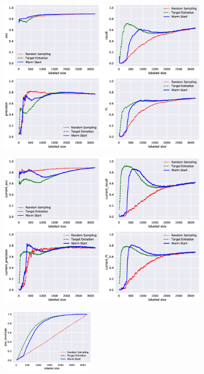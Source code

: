 \documentclass{deime}
\begin{document}

\begin{figure}[!t]
\includegraphics[width=0.9\textwidth]{resource/imdb/oracle_k-fold5}
\label{oracle2}
\end{figure}

\begin{figure}[!t]
\includegraphics[width=0.9\textwidth]{resource/imdb/current_k-fold5}
\label{current2}
\end{figure}

\begin{figure}[!t]
\includegraphics[width=0.4\textwidth]{resource/imdb/pos_coverage}
\label{pos_cov2}
\end{figure}
\end{document}
